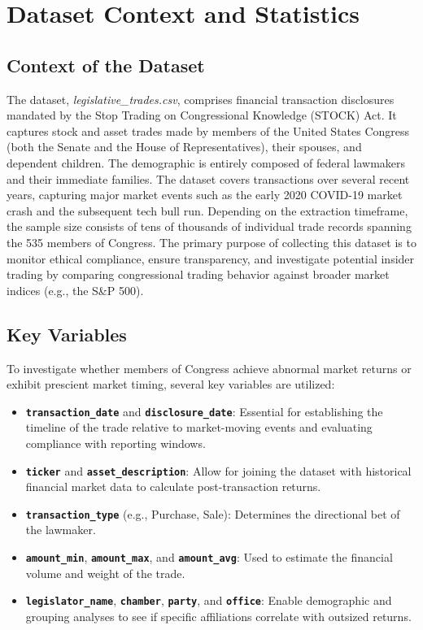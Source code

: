 \documentclass{article}
\begin{document}
\section*{Dataset Context and Statistics}

\subsection*{Context of the Dataset}
The dataset, \textit{legislative\_trades.csv}, comprises financial transaction disclosures mandated by the Stop Trading on Congressional Knowledge (STOCK) Act. It captures stock and asset trades made by members of the United States Congress (both the Senate and the House of Representatives), their spouses, and dependent children. The demographic is entirely composed of federal lawmakers and their immediate families. The dataset covers transactions over several recent years, capturing major market events such as the early 2020 COVID-19 market crash and the subsequent tech bull run. Depending on the extraction timeframe, the sample size consists of tens of thousands of individual trade records spanning the 535 members of Congress. The primary purpose of collecting this dataset is to monitor ethical compliance, ensure transparency, and investigate potential insider trading by comparing congressional trading behavior against broader market indices (e.g., the S\&P 500).

\subsection*{Key Variables}
To investigate whether members of Congress achieve abnormal market returns or exhibit prescient market timing, several key variables are utilized:
\begin{itemize}
    \item \textbf{\texttt{transaction\_date}} and \textbf{\texttt{disclosure\_date}}: Essential for establishing the timeline of the trade relative to market-moving events and evaluating compliance with reporting windows.
    \item \textbf{\texttt{ticker}} and \textbf{\texttt{asset\_description}}: Allow for joining the dataset with historical financial market data to calculate post-transaction returns.
    \item \textbf{\texttt{transaction\_type}} (e.g., Purchase, Sale): Determines the directional bet of the lawmaker.
    \item \textbf{\texttt{amount\_min}}, \textbf{\texttt{amount\_max}}, and \textbf{\texttt{amount\_avg}}: Used to estimate the financial volume and weight of the trade.
    \item \textbf{\texttt{legislator\_name}}, \textbf{\texttt{chamber}}, \textbf{\texttt{party}}, and \textbf{\texttt{office}}: Enable demographic and grouping analyses to see if specific affiliations correlate with outsized returns.
\end{itemize}
\end{document}

